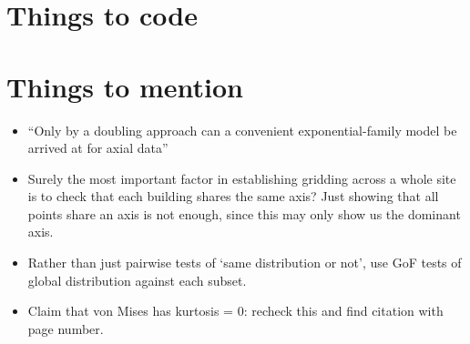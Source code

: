 \documentclass[10pt,fleqn]{article}
\begin{document}
\section*{Things to code}
\vspace{-15pt}






\section*{Things to mention}
\begin{itemize}

\item 
``Only by a doubling approach can a convenient exponential-family model be arrived at for axial data'' \cite{Arnold2011}

\item
Surely the most important factor in establishing gridding across a whole site is to check that each building shares the same axis? Just showing that all points share an axis is not enough, since this may only show us the dominant axis.
 
\item
Rather than just pairwise tests of `same distribution or not', use GoF tests of global distribution against each subset.

\item
Claim that von Mises has kurtosis = 0: recheck this and find citation with page number.
\end{itemize}

\end{document}
